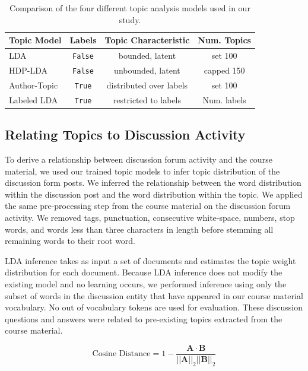 \documentclass[sigconf, anonymous]{acmart}
\begin{document}
\begin{table}
    \centering
    \begin{tabularx}{\columnwidth}{@{}lccc@{}}
    \toprule
    Topic Model & Labels & Topic Characteristic & Num. Topics \\
    \midrule
    LDA & \texttt{False} & bounded, latent & set 100 \\
    HDP-LDA & \texttt{False} & unbounded, latent  & capped 150 \\
    Author-Topic & \texttt{True} & distributed over labels & set 100 \\
    Labeled LDA & \texttt{True} & restricted to labels & Num. labels \\
    \bottomrule
    \end{tabularx}
    \caption{Comparison of the four different topic analysis models used in our study.}
    \label{tab:topic_models}
\end{table}

\subsection{Relating Topics to Discussion Activity}
To derive a relationship between discussion forum activity and the course material, we used our trained topic models to infer topic distribution of the discussion form posts.
We inferred the relationship between the word distribution within the discussion post and the word distribution within the topic.
We applied the same pre-processing step from the course material on the discussion forum activity. We removed tags, punctuation, consecutive white-space, numbers, stop words, and words less than three characters in length before stemming all remaining words to their root word.

LDA inference takes as input a set of documents and estimates the topic weight distribution for each document.
Because LDA inference does not modify the existing model and no learning occurs, we performed inference using only the subset of words in the discussion entity that have appeared in our course material vocabulary.
No out of vocabulary tokens are used for evaluation.
These discussion questions and answers were related to pre-existing topics extracted from the course material.

\begin{equation}
    \text{Cosine Distance} = 1 - \frac {\pmb A \cdot \pmb B}{||\pmb A||_2 ||\pmb B||_2}
    \label{eq:cos_distance}
\end{equation}
\end{document}
